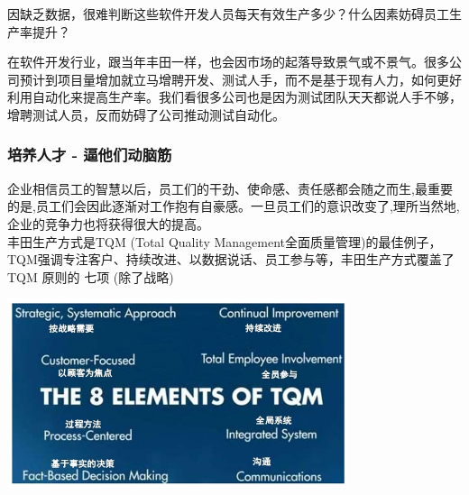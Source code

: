 因缺乏数据，很难判断这些软件开发人员每天有效生产多少？什么因素妨碍员工生产率提升？\\


在软件开发行业，跟当年丰田一样，也会因市场的起落导致景气或不景气。很多公司预计到项目量增加就立马增聘开发、测试人手，而不是基于现有人力，如何更好利用自动化来提高生产率。我们看很多公司也是因为测试团队天天都说人手不够，增聘测试人员，反而妨碍了公司推动测试自动化。\\

\hypertarget{ux57f9ux517bux4ebaux624d---ux903cux4ed6ux4eecux52a8ux8111ux7b4b}{%
\subsubsection{培养人才 -
逼他们动脑筋}\label{ux57f9ux517bux4ebaux624d---ux903cux4ed6ux4eecux52a8ux8111ux7b4b}}


企业相信员工的智慧以后，员工们的干劲、使命感、责任感都会随之而生,最重要的是,员工们会因此逐渐对工作抱有自豪感。一旦员工们的意识改变了,理所当然地,企业的竞争力也将获得很大的提高。\\
丰田生产方式是TQM (Total Quality
Management全面质量管理)的最佳例子，TQM强调专注客户、持续改进、以数据说话、员工参与等，丰田生产方式覆盖了
TQM 原则的 七项 (除了战略)


\includegraphics[width=10cm]{TQM_1_2.jpg}

